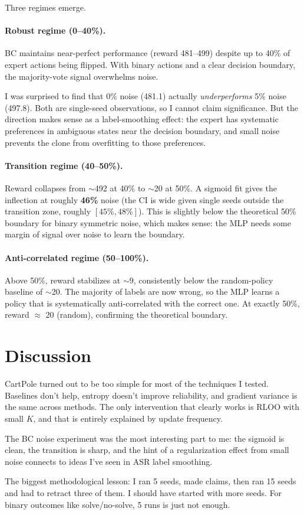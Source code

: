 \documentclass{article}
\begin{document}
Three regimes emerge.

\paragraph{Robust regime (0--40\%).}
BC maintains near-perfect performance (reward 481--499) despite up to 40\% of expert actions being flipped.
With binary actions and a clear decision boundary, the majority-vote signal overwhelms noise.

I was surprised to find that 0\% noise (481.1) actually \emph{underperforms} 5\% noise (497.8).
Both are single-seed observations, so I cannot claim significance.
But the direction makes sense as a label-smoothing effect: the expert has systematic preferences in ambiguous states near the decision boundary, and small noise prevents the clone from overfitting to those preferences.

\paragraph{Transition regime (40--50\%).}
Reward collapses from $\sim$492 at 40\% to $\sim$20 at 50\%.
A sigmoid fit gives the inflection at roughly \textbf{46\%} noise (the CI is wide given single seeds outside the transition zone, roughly $[45\%, 48\%]$).
This is slightly below the theoretical 50\% boundary for binary symmetric noise, which makes sense: the MLP needs some margin of signal over noise to learn the boundary.

\paragraph{Anti-correlated regime (50--100\%).}
Above 50\%, reward stabilizes at $\sim$9, consistently below the random-policy baseline of $\sim$20.
The majority of labels are now wrong, so the MLP learns a policy that is systematically anti-correlated with the correct one.
At exactly 50\%, reward $\approx$ 20 (random), confirming the theoretical boundary.

\section{Discussion}
\label{sec:discussion}

CartPole turned out to be too simple for most of the techniques I tested.
Baselines don't help, entropy doesn't improve reliability, and gradient variance is the same across methods.
The only intervention that clearly works is RLOO with small $K$, and that is entirely explained by update frequency.

The BC noise experiment was the most interesting part to me: the sigmoid is clean, the transition is sharp, and the hint of a regularization effect from small noise connects to ideas I've seen in ASR label smoothing.

The biggest methodological lesson: I ran 5 seeds, made claims, then ran 15 seeds and had to retract three of them.
I should have started with more seeds.
For binary outcomes like solve/no-solve, 5 runs is just not enough.

\end{document}
